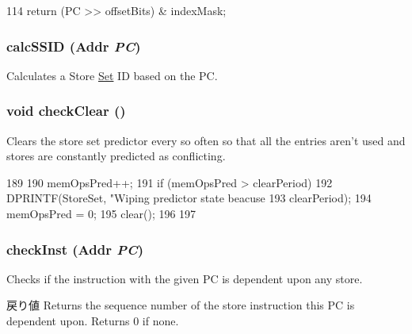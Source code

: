 \begin{DoxyCode}
114     { return (PC >> offsetBits) & indexMask; }
\end{DoxyCode}
\hypertarget{classStoreSet_a6b9767a09067554b634a93c4454fa136}{
\subsubsection[{calcSSID}]{ calcSSID ({\bf Addr} {\em PC})}}
\label{classStoreSet_a6b9767a09067554b634a93c4454fa136}
Calculates a Store \hyperlink{classSet}{Set} ID based on the PC. 


\hypertarget{classStoreSet_a4dab67311167cad2367beac85376a3bc}{
\subsubsection[{checkClear}]{\setlength{\rightskip}{0pt plus 5cm}void checkClear ()}}
\label{classStoreSet_a4dab67311167cad2367beac85376a3bc}
Clears the store set predictor every so often so that all the entries aren't used and stores are constantly predicted as conflicting. 


\begin{DoxyCode}
189 {
190     memOpsPred++;
191     if (memOpsPred > clearPeriod) {
192         DPRINTF(StoreSet, "Wiping predictor state beacuse %
193                 clearPeriod);
194         memOpsPred = 0;
195         clear();
196     }
197 }
\end{DoxyCode}
\hypertarget{classStoreSet_ae8d309615668a58409f29cc73457c7c9}{
\subsubsection[{checkInst}]{ checkInst ({\bf Addr} {\em PC})}}
\label{classStoreSet_ae8d309615668a58409f29cc73457c7c9}
Checks if the instruction with the given PC is dependent upon any store. \begin{DoxyReturn}{戻り値}
Returns the sequence number of the store instruction this PC is dependent upon. Returns 0 if none. 
\end{DoxyReturn}



